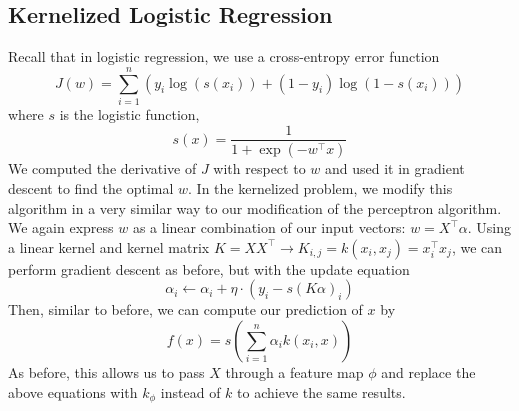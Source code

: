 \documentclass{article}
\begin{document}
\subsection{Kernelized Logistic Regression}
Recall that in logistic regression, we use a cross-entropy error function
$$ J(w) = \sum_{i = 1}^n (y_i \log(s(x_i)) + (1 - y_i) \log(1 - s(x_i))) $$
where $ s $ is the logistic function,
$$ s(x) = \frac{1}{1 + \exp(- w^\intercal x)} $$
We computed the derivative of $ J $ with respect to $ w $ and used it in gradient descent to find the optimal $ w $. In the kernelized problem, we modify this algorithm in a very similar way to our modification of the perceptron algorithm. We again express $ w $ as a linear combination of our input vectors: $ w = X^\intercal \alpha $. Using a linear kernel and kernel matrix $ K = X X^\intercal \rightarrow K_{i, j} = k(x_i, x_j) = x_i^\intercal x_j $, we can perform gradient descent as before, but with the update equation
$$ \alpha_i \gets \alpha_i + \eta \cdot (y_i - s(K \alpha)_i) $$
Then, similar to before, we can compute our prediction of $ x $ by
$$ f(x) = s \left( \sum_{i = 1}^n \alpha_i k(x_i, x) \right) $$
As before, this allows us to pass $ X $ through a feature map $ \phi $ and replace the above equations with $ k_\phi $ instead of $ k $ to achieve the same results.
\end{document}

